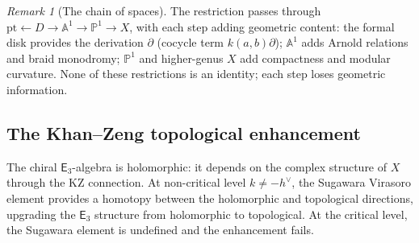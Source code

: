 \documentclass[11pt,reqno]{amsart}
\theoremstyle{definition}
\theoremstyle{remark}
\newtheorem{remark}[theorem]{Remark}
\newcommand{\Ethree}{\mathsf{E}_{3}}
\newcommand{\PP}{\mathbb{P}}
\numberwithin{equation}{section}
\begin{document}
\begin{remark}[The chain of spaces]
\label{rem:disk-vs-point}
The restriction passes through
$\mathrm{pt} \leftarrow D \to \mathbb{A}^1 \to \PP^1
\to X$, with each step adding geometric content: the formal
disk provides the derivation $\partial$ (cocycle term
$k(a,b)\partial$); $\mathbb{A}^1$ adds Arnold relations
and braid monodromy; $\PP^1$ and higher-genus $X$ add
compactness and modular curvature. None of these
restrictions is an identity; each step loses geometric
information.
\end{remark}


\subsection{The Khan--Zeng topological enhancement}
\label{subsec:khan-zeng-enhancement}

The chiral $\Ethree$-algebra is holomorphic: it depends on the
complex structure of $X$ through the KZ connection. At
non-critical level $k \neq -h^\vee$, the Sugawara Virasoro
element provides a homotopy between the holomorphic and
topological directions, upgrading the $\Ethree$ structure
from holomorphic to topological. At the critical level,
the Sugawara element is undefined and the enhancement fails.
\end{document}
